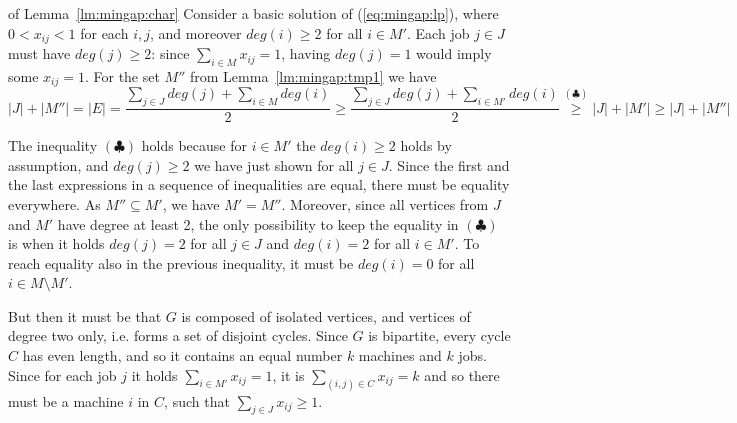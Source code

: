 \begin{dokazpar}{of Lemma~\ref{lm:mingap:char}}
  Consider a basic solution of (\ref{eq:mingap:lp}), where $0<x_{ij}<1$ for each $i,j$, and moreover
   $deg(i)\ge2$ for all $i\in M'$. Each job $j\in J$ must have   $deg(j)\ge2$: since  $\sum_{i\in M}x_{ij}=1$,
   having  $deg(j)=1$ would imply some $x_{ij}=1$. For the set $M''$ from Lemma~\ref{lm:mingap:tmp1} we have
  $$|J|+|M''|=|E|=\frac{\sum\limits_{j\in J}deg(j) + \sum\limits_{i\in M}deg(i)}{2}
  \ge\frac{\sum\limits_{j\in J}deg(j) + \sum\limits_{i\in M'}deg(i)}{2}
  \stackrel{(\clubsuit)}{\ge}|J|+|M'|\ge |J| + |M''|
  $$

  \noindent
  The inequality $(\clubsuit)$ holds because for  $i\in M'$ the  $deg(i)\ge 2$ holds by assumption, and
  $deg(j)\ge 2$ we have just shown for all $j\in J$. Since the first and the last expressions in a sequence
  of inequalities are equal, there must be equality everywhere. As $M''\subseteq M'$, we have $M'=M''$.
  Moreover, since all vertices from $J$ and $M'$ have degree at least 2, 
  the only possibility to keep the equality in $(\clubsuit)$ is when
  it holds  $deg(j)=2$  for all $j\in J$ and $deg(i)=2$ for all $i\in M'$. To reach equality also in 
  the previous inequality, it must be  $deg(i)=0$ for all $i\in M\setminus M'$.

  \noindent
  But then it must be that $G$ is composed of isolated vertices, and vertices of degree two only, i.e. forms
  a set of disjoint cycles. Since $G$ is bipartite, every cycle $C$ has even length, and so it contains an equal
  number $k$  machines and $k$ jobs. Since for each job $j$ it holds $\sum_{i\in M'}x_{ij}=1$, it is
   $\sum_{(i,j)\in C}x_{ij}=k$ and so there must be a machine $i$ in $C$, such that  $\sum_{j\in J}x_{ij}\ge1$.
\end{dokazpar}

